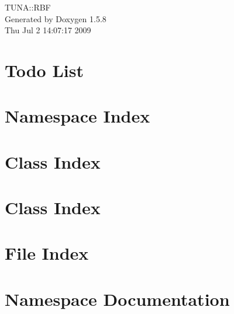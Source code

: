\documentclass[a4paper]{article}
\begin{document}
\begin{titlepage}
\vspace*{7cm}
\begin{center}
{\Large TUNA::RBF }\\
\vspace*{1cm}
{\large Generated by Doxygen 1.5.8}\\
\vspace*{0.5cm}
{\small Thu Jul 2 14:07:17 2009}\\
\end{center}
\end{titlepage}
\tableofcontents
{}
\section{Todo List}
\label{todo}
\hypertarget{todo}{}

\section{Namespace Index}

\section{Class Index}

\section{Class Index}

\section{File Index}

\section{Namespace Documentation}




\end{document}
